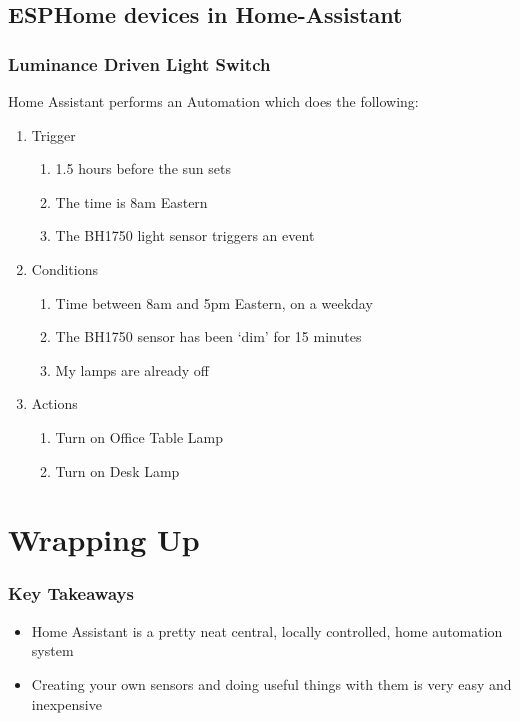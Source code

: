 \documentclass[aspectratio=169]{beamer}
\begin{document}
\subsection{ESPHome devices in Home-Assistant}
\begin{frame}[fragile]
  \frametitle{Luminance Driven Light Switch}
  Home Assistant performs an Automation which does the following:
  \begin{enumerate}%
    \item{Trigger}
      \begin{enumerate}
        \item{1.5 hours before the sun sets}
        \item{The time is 8am Eastern}
        \item{The BH1750 light sensor triggers an event}
      \end{enumerate}
    \item{Conditions}
      \begin{enumerate}
        \item{Time between 8am and 5pm Eastern, on a weekday}
        \item{The BH1750 sensor has been `dim' for 15 minutes}
        \item{My lamps are already off}
      \end{enumerate}
    \item{Actions}
      \begin{enumerate}
        \item{Turn on Office Table Lamp}
        \item{Turn on Desk Lamp}
      \end{enumerate}
  \end{enumerate}
\end{frame}

\section{Wrapping Up}
\frame{\sectionpage}

\begin{frame}
  \frametitle{Key Takeaways}
  \begin{itemize}[<+->]
    \item{Home Assistant is a pretty neat central, locally controlled, home automation system}
    \item{Creating your own sensors and doing useful things with them is very easy and inexpensive}
  \end{itemize}
\end{frame}
\end{document}
